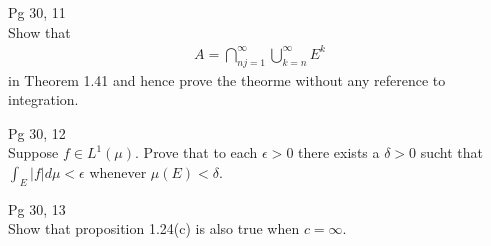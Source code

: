 \documentclass[10pt,a4paper]{report}
\begin{document}
\HLINE
\noindent Pg 30, 11\\

Show that 
\begin{align*}
	A = \bigcap_{nj=1}^\infty \bigcup_{k=n}^\infty E^k
\end{align*}in Theorem 1.41 and hence prove the theorme without any reference to integration.


\HLINE
\noindent Pg 30, 12\\

Suppose $f \in L^1(\mu)$.  Prove that to each $\epsilon > 0$ there exists a $\delta > 0$ sucht that $\int_E|f| d\mu < \epsilon$ whenever $\mu(E) < \delta$.


\HLINE
\noindent Pg 30, 13\\

Show that proposition 1.24(c) is also true when $c = \infty$.
\end{document}
